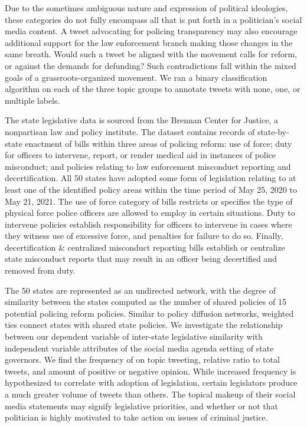 \documentclass[12pt]{article}
\begin{document}
Due to the sometimes ambiguous nature and expression of political
ideologies, these categories do not fully encompass all that is put
forth in a politician's social media content. A tweet advocating for
policing transparency may also encourage additional support for the law
enforcement branch making those changes in the same breath. Would such a
tweet be aligned with the movement calls for reform, or against the
demands for defunding? Such contradictions fall within the mixed goals
of a grassroots-organized movement. We ran a binary classification
algorithm on each of the three topic groups to annotate tweets with
none, one, or multiple labels.

The state legislative data is sourced from the Brennan Center for
Justice, a nonpartisan law and policy institute. The dataset contains
records of state-by-state enactment of bills within three areas of
policing reform: use of force; duty for officers to intervene, report,
or render medical aid in instances of police misconduct; and policies
relating to law enforcement misconduct reporting and decertification.
All 50 states have adopted some form of legislation relating to at least
one of the identified policy areas within the time period of May 25,
2020 to May 21, 2021. The use of force category of bills restricts or
specifies the type of physical force police officers are allowed to
employ in certain situations. Duty to intervene policies establish
responsibility for officers to intervene in cases where they witness use
of excessive force, and penalties for failure to do so. Finally,
decertification \& centralized misconduct reporting bills establish or
centralize state misconduct reports that may result in an officer being
decertified and removed from duty.

The 50 states are represented as an undirected network, with the degree
of similarity between the states computed as the number of shared
policies of 15 potential policing reform policies. Similar to policy
diffusion networks, weighted ties connect states with shared state
policies. We investigate the relationship between our dependent variable
of inter-state legislative similarity with independent variable
attributes of the social media agenda setting of state governors. We
find the frequency of on topic tweeting, relative ratio to total tweets,
and amount of positive or negative opinion. While increased frequency is
hypothesized to correlate with adoption of legislation, certain
legislators produce a much greater volume of tweets than others. The
topical makeup of their social media statements may signify legislative
priorities, and whether or not that politician is highly motivated to
take action on issues of criminal justice.
\end{document}
